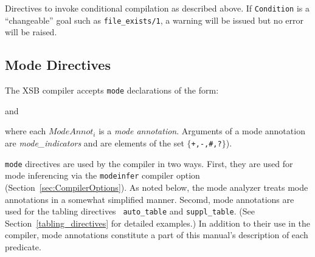 \begin{description}
%
Directives to invoke conditional compilation as described above.  If
{\tt Condition} is a ``changeable'' goal such as {\tt file\_exists/1},
a warning will be issued but no error will be raised.
\end{description}


\subsection{Mode Directives}\label{mode_declarations}

The XSB compiler accepts {\tt mode} declarations of the form:


and


\noindent
where each $ModeAnnot_i$ is a {\em mode annotation\/}.  Arguments of a
mode annotation are {\em mode\_indicators} and are elements of the set
{\tt $\{$+,-,\#,?$\}$}).

{\tt mode} directives are used by the compiler in two ways.  First,
they are used for mode inferencing via the {\tt modeinfer} compiler
option (Section~\ref{sec:CompilerOptions}).  As noted below, the mode
analyzer treats mode annotations in a somewhat simplified manner.
Secomd, mode annotations are used for the tabling directives {\tt
  auto\_table} and {\tt suppl\_table}.  (See
Section~\ref{tabling_directives} for detailed examples.)  In addition
to their use in the compiler, mode annotations constitute a part of
this manual's description of each predicate.

